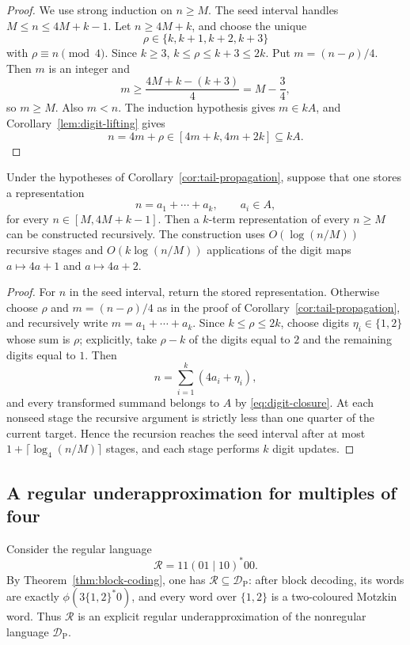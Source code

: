 \documentclass{ws-ijfcs}
\newcommand{\DP}{\mathcal{D}_{\mathrm{P}}}
\begin{document}
\begin{proof}
We use strong induction on $n\geq M$.  The seed interval handles
$M\leq n\leq4M+k-1$.  Let $n\geq4M+k$, and choose the unique
\[
 \rho\in\{k,k+1,k+2,k+3\}
\]
with $\rho\equiv n\pmod4$.  Since $k\geq3$,
$k\leq\rho\leq k+3\leq2k$.  Put $m=(n-\rho)/4$.  Then $m$ is an
integer and
\[
 m\geq\frac{4M+k-(k+3)}4=M-\frac34,
\]
so $m\geq M$.  Also $m<n$.  The induction hypothesis gives $m\in kA$,
and Corollary~\ref{lem:digit-lifting} gives
\[
 n=4m+\rho\in[4m+k,4m+2k]\subseteq kA.
\]
\end{proof}

\begin{corollary}
\label{cor:constructive-tail}
Under the hypotheses of Corollary~\ref{cor:tail-propagation}, suppose that
one stores a representation
\[
 n=a_1+\cdots+a_k,\qquad a_i\in A,
\]
for every $n\in[M,4M+k-1]$.  Then a $k$-term representation of every
$n\geq M$ can be constructed recursively.  The construction uses
$O(\log(n/M))$ recursive stages and $O(k\log(n/M))$ applications of the
digit maps $a\mapsto4a+1$ and $a\mapsto4a+2$.
\end{corollary}

\begin{proof}
For $n$ in the seed interval, return the stored representation.  Otherwise
choose $\rho$ and $m=(n-\rho)/4$ as in the proof of
Corollary~\ref{cor:tail-propagation}, and recursively write
$m=a_1+\cdots+a_k$.  Since $k\leq\rho\leq2k$, choose digits
$\eta_i\in\{1,2\}$ whose sum is $\rho$; explicitly, take
$\rho-k$ of the digits equal to $2$ and the remaining digits equal to $1$.
Then
\[
 n=\sum_{i=1}^k(4a_i+\eta_i),
\]
and every transformed summand belongs to $A$ by
\eqref{eq:digit-closure}.  At each nonseed stage the recursive argument is
strictly less than one quarter of the current target.  Hence the recursion
reaches the seed interval after at most
$1+\lceil\log_4(n/M)\rceil$ stages, and each stage performs $k$ digit
updates.
\end{proof}
\subsection{A regular underapproximation for multiples of four}

Consider the regular language
\[
 \mathcal R=11(01\mid10)^*00.
\]
By Theorem~\ref{thm:block-coding}, one has
$\mathcal R\subseteq\DP$: after block decoding, its words are exactly
$\phi(3\{1,2\}^*0)$, and every word over $\{1,2\}$ is a two-coloured
Motzkin word.  Thus $\mathcal R$ is an explicit regular
underapproximation of the nonregular language $\DP$.
\end{document}
